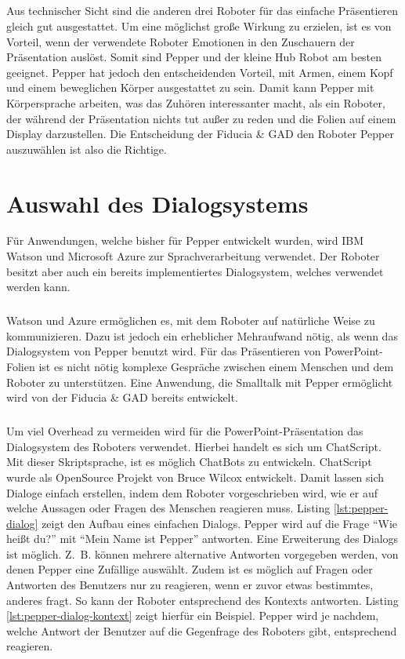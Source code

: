 \subparagraph{}
Aus technischer Sicht sind die anderen drei Roboter für das einfache
Präsentieren gleich gut ausgestattet. Um eine möglichst große Wirkung zu
erzielen, ist es von Vorteil, wenn der verwendete Roboter Emotionen in den
Zuschauern der Präsentation auslöst. Somit sind Pepper und der kleine Hub
Robot am besten geeignet. Pepper hat jedoch den entscheidenden Vorteil, mit
Armen, einem Kopf und einem beweglichen Körper ausgestattet zu sein. Damit kann
Pepper mit Körpersprache arbeiten, was das Zuhören interessanter macht, als ein
Roboter, der während der Präsentation nichts tut außer zu reden und die Folien
auf einem Display darzustellen. Die Entscheidung der Fiducia \& GAD den Roboter
Pepper auszuwählen ist also die Richtige.

\section{Auswahl des Dialogsystems}\label{sec:auswahl-dialogsystem}
Für Anwendungen, welche bisher für Pepper entwickelt wurden, wird IBM Watson und
Microsoft Azure zur Sprachverarbeitung verwendet. Der Roboter besitzt aber auch
ein bereits implementiertes Dialogsystem, welches verwendet werden kann.

\subparagraph{}
Watson und Azure ermöglichen es, mit dem Roboter auf natürliche Weise zu
kommunizieren. Dazu ist jedoch ein erheblicher Mehraufwand nötig, als wenn das
Dialogsystem von Pepper benutzt wird. Für das Präsentieren von PowerPoint-Folien
ist es nicht nötig komplexe Gespräche zwischen einem Menschen und dem Roboter zu
unterstützen. Eine Anwendung, die Smalltalk mit Pepper ermöglicht wird von der
Fiducia \& GAD bereits entwickelt.

%
%

\subparagraph{}
Um viel Overhead zu vermeiden wird für die PowerPoint-Präsentation das
Dialogsystem des Roboters verwendet. Hierbei handelt es sich um ChatScript.
Mit dieser Skriptsprache, ist es möglich ChatBots zu entwickeln. ChatScript
wurde als OpenSource Projekt von Bruce Wilcox entwickelt. Damit lassen
sich Dialoge einfach erstellen, indem dem Roboter vorgeschrieben wird, wie er
auf welche Aussagen oder Fragen des Menschen reagieren muss.
Listing \ref{lst:pepper-dialog} zeigt den Aufbau eines einfachen Dialogs.
Pepper wird auf die Frage "`Wie heißt du?"' mit "`Mein Name ist Pepper"'
antworten. Eine Erweiterung des Dialogs ist möglich. Z.~B. können mehrere
alternative Antworten vorgegeben werden, von denen Pepper eine Zufällige
auswählt. Zudem ist es möglich auf Fragen oder Antworten des Benutzers nur zu
reagieren, wenn er zuvor etwas bestimmtes, anderes fragt.
So kann der Roboter entsprechend des Kontexts antworten. Listing
\ref{lst:pepper-dialog-kontext} zeigt hierfür ein Beispiel. Pepper wird je
nachdem, welche Antwort der Benutzer auf die Gegenfrage des Roboters gibt,
entsprechend reagieren.

